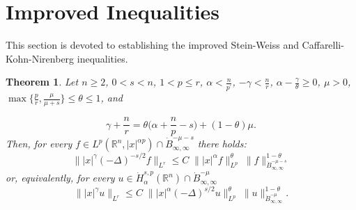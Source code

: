 \documentclass[12pt]{amsart}
\newcommand {\R}{\mathbb{R}}
\newcommand {\be}{\begin{equation}}
\newcommand {\ee}{\end{equation}}
\newtheorem{theorem}{Theorem}[section]
\begin{document}
\section{Improved Inequalities}

This section is devoted to  establishing the improved Stein-Weiss and Caffarelli-Kohn-Nirenberg inequalities. 

\begin{theorem}
\label{teorema-besov-infty}
Let
$n\ge 2$, $0<s<n$, $1<p\le r$, $\alpha<\frac{n}{p^\prime}$, $-\gamma<\frac{n}{r}$, 
$\alpha- \frac{\gamma}{\theta} \geq 0$, $\mu>0$,
$ \max\{\frac{p}{r},\frac{\mu}{\mu+s}\} \le \theta \le 1$, and 

\be
\label{reescale-infty}
 \gamma + \frac{n}{r}= \theta \Big(\alpha + \frac{n}{p}-s \Big) + (1-\theta) \mu.
 \ee
Then, for every $f \in L^p(\R^n,|x|^{\alpha p})  \cap \dot{B}^{-\mu-s}_{\infty,\infty}$ 
there holds:
\begin{equation*} 
\| |x|^\gamma (-\Delta)^{-s/2} f  \|_{L^r} \leq 
C \; \| |x|^{\alpha} f  \|_{L^p}^\theta \;  \| f \|_{\dot{B}^{-\mu-s}_{\infty,\infty}}^{1-\theta}
\end{equation*}
or, equivalently, for every $u\in \dot{H}^{s,p}_\alpha(\R^n) \cap 
\dot{B}^{-\mu}_{\infty,\infty} $ 
\begin{equation*} 
 \| |x|^\gamma u \|_{L^r} \leq 
C \; \| |x|^{\alpha} (-\Delta)^{s/2} u  \|_{L^p}^\theta \;  \| u \|_{\dot{B}^{-\mu}_{\infty,\infty}}^{1-\theta}.
\end{equation*}

\end{theorem}
\end{document}
